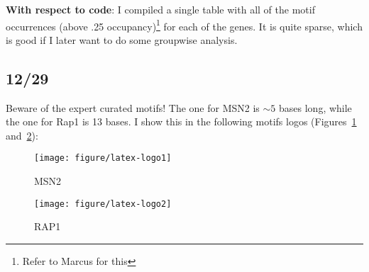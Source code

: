 \documentclass[12pt]{article}\usepackage[]{graphicx}\usepackage[]{color}
\newenvironment{knitrout}{}{} %
\begin{document}
\textbf{With respect to code}:
I compiled a single table with all of the motif occurrences (above .25 occupancy)\footnote{Refer to Marcus for this} for each of the genes. It is quite sparse, which is good if I later want to do some groupwise analysis.

\subsection{12/29}
Beware of the expert curated motifs! The one for MSN2 is $\sim 5$ bases long, while the one for Rap1 is 13 bases. I show this in the following motifs logos (Figures~\ref{fig:logo1} and~\ref{fig:logo2}):

\begin{knitrout}
\color{fgcolor}\begin{figure}[]


{\centering \texttt{[image: figure/latex-logo1]} 

}

\caption[MSN2]{MSN2\label{fig:logo1}}
\end{figure}


\end{knitrout}


\begin{knitrout}
\color{fgcolor}\begin{figure}[]


{\centering \texttt{[image: figure/latex-logo2]} 

}

\caption[RAP1]{RAP1\label{fig:logo2}}
\end{figure}


\end{knitrout}
\end{document}

